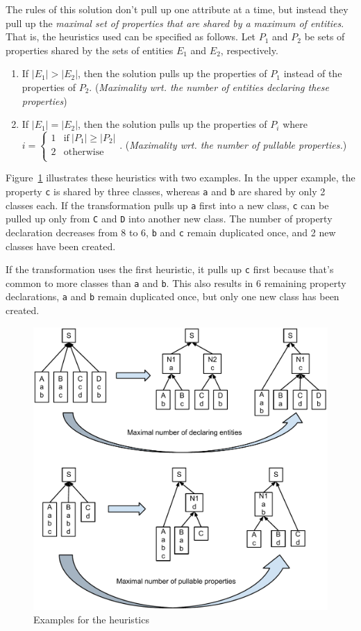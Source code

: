 \documentclass[11pt]{article}
\begin{document}
The rules of this solution don't pull up one attribute at a time, but instead
they pull up the \emph{maximal set of properties that are shared by a maximum
  of entities}.  That is, the heuristics used can be specified as follows.  Let
$P_1$ and $P_2$ be sets of properties shared by the sets of entities $E_1$ and
$E_2$, respectively.

\begin{enumerate}
\item If $|E_1| > |E_2|$, then the solution pulls up the properties of $P_1$
  instead of the properties of $P_2$.  (\emph{Maximality wrt. the number of
    entities declaring these properties})
\item If $|E_1| = |E_2|$, then the solution pulls up the properties of $P_i$
  where~$i = \left\{\begin{array}{ll}1 & \text{if}~|P_1| \geq |P_2|\\2 &
      \text{otherwise}\\ \end{array}\right.$.  (\emph{Maximality wrt. the
    number of pullable properties.})
\end{enumerate}

Figure~\ref{fig:heuristics-example} illustrates these heuristics with two
examples.  In the upper example, the property \verb|c| is shared by three
classes, whereas \verb|a| and \verb|b| are shared by only 2 classes each.  If
the transformation pulls up \verb|a| first into a new class, \verb|c| can be
pulled up only from \verb|C| and \verb|D| into another new class.  The number
of property declaration decreases from 8 to 6, \verb|b| and \verb|c| remain
duplicated once, and 2 new classes have been created.

If the transformation uses the first heuristic, it pulls up \verb|c| first
because that's common to more classes than \verb|a| and \verb|b|.  This also
results in 6 remaining property declarations, \verb|a| and \verb|b| remain
duplicated once, but only one new class has been created.

\begin{figure}[t]
  \centering
  \includegraphics[width=0.6\linewidth]{heuristics-example}
  \caption{Examples for the heuristics}
  \label{fig:heuristics-example}
\end{figure}
\end{document}
